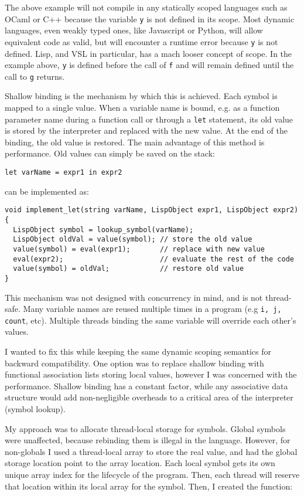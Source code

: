 The above example will not compile in any statically scoped languages such as OCaml or C++
because the variable \texttt{y} is not defined in its scope.
Most dynamic languages, even weakly typed ones, like Javascript or Python, will allow equivalent
code as valid, but will encounter a runtime error because \texttt{y} is not defined.
Lisp, and VSL in particular, has a mach looser concept of scope.
In the example above, \texttt{y} is defined before the call of \texttt{f} and will remain defined until the
call to \texttt{g} returns.

Shallow binding is the mechanism by which this is achieved. Each symbol is mapped to a single value.
When a variable name is bound, e.g. as a function parameter name during a function call or through a
\texttt{let} statement, its old value is stored by the interpreter and replaced with the new value. At the end of the binding,
the old value is restored. The main advantage of this method is performance. Old values can simply be saved
on the stack:
\begin{verbatim}
let varName = expr1 in expr2
\end{verbatim}

can be implemented as:

\begin{verbatim}
void implement_let(string varName, LispObject expr1, LispObject expr2) {
  LispObject symbol = lookup_symbol(varName);
  LispObject oldVal = value(symbol); // store the old value
  value(symbol) = eval(expr1);       // replace with new value
  eval(expr2);                       // evaluate the rest of the code
  value(symbol) = oldVal;            // restore old value
}
\end{verbatim}

This mechanism was not designed with concurrency in mind, and is not thread-safe.
Many variable names are reused multiple times in a program (e.g \texttt{i, j, count}, etc).
Multiple threads binding the same variable will override each other's values.

I wanted to fix this while keeping the same dynamic scoping semantics for backward compatibility.
One option was to replace shallow binding with functional association lists storing local values,
however I was concerned with the performance. Shallow binding has a constant factor, while any
associative data structure would add non-negligible overheads to a critical area of the
interpreter (symbol lookup).

My approach was to allocate thread-local storage for symbols.
Global symbols were unaffected, because rebinding them is illegal in the language. However,
for non-globals I used a thread-local array to store the real value, and had the global storage
location point to the array location. Each local symbol gets its own unique array index for the lifecycle
of the program. Then, each thread will reserve that location within its local array for the symbol.
Then, I created the function:

